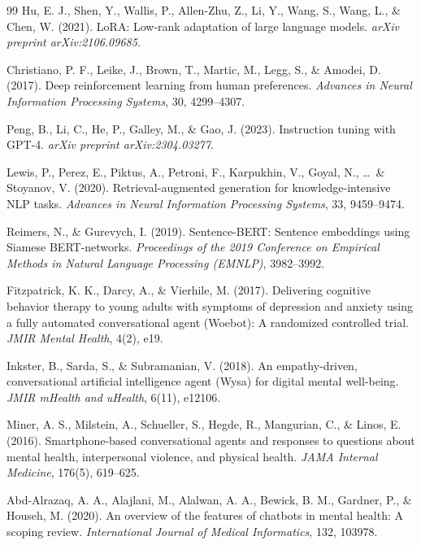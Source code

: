 \documentclass[12pt,twoside]{article}
\begin{document}
\begin{thebibliography}{99}
Hu, E. J., Shen, Y., Wallis, P., Allen-Zhu, Z., Li, Y., Wang, S., Wang, L., \& Chen, W. (2021). LoRA: Low-rank adaptation of large language models. \textit{arXiv preprint arXiv:2106.09685}.

Christiano, P. F., Leike, J., Brown, T., Martic, M., Legg, S., \& Amodei, D. (2017). Deep reinforcement learning from human preferences. \textit{Advances in Neural Information Processing Systems}, 30, 4299--4307.

Peng, B., Li, C., He, P., Galley, M., \& Gao, J. (2023). Instruction tuning with GPT-4. \textit{arXiv preprint arXiv:2304.03277}.


Lewis, P., Perez, E., Piktus, A., Petroni, F., Karpukhin, V., Goyal, N., \ldots\ \& Stoyanov, V. (2020). Retrieval-augmented generation for knowledge-intensive NLP tasks. \textit{Advances in Neural Information Processing Systems}, 33, 9459--9474.

Reimers, N., \& Gurevych, I. (2019). Sentence-BERT: Sentence embeddings using Siamese BERT-networks. \textit{Proceedings of the 2019 Conference on Empirical Methods in Natural Language Processing (EMNLP)}, 3982--3992.


Fitzpatrick, K. K., Darcy, A., \& Vierhile, M. (2017). Delivering cognitive behavior therapy to young adults with symptoms of depression and anxiety using a fully automated conversational agent (Woebot): A randomized controlled trial. \textit{JMIR Mental Health}, 4(2), e19.

Inkster, B., Sarda, S., \& Subramanian, V. (2018). An empathy-driven, conversational artificial intelligence agent (Wysa) for digital mental well-being. \textit{JMIR mHealth and uHealth}, 6(11), e12106.

Miner, A. S., Milstein, A., Schueller, S., Hegde, R., Mangurian, C., \& Linos, E. (2016). Smartphone-based conversational agents and responses to questions about mental health, interpersonal violence, and physical health. \textit{JAMA Internal Medicine}, 176(5), 619--625.

Abd-Alrazaq, A. A., Alajlani, M., Alalwan, A. A., Bewick, B. M., Gardner, P., \& Househ, M. (2020). An overview of the features of chatbots in mental health: A scoping review. \textit{International Journal of Medical Informatics}, 132, 103978.


\end{thebibliography}
\end{document}
